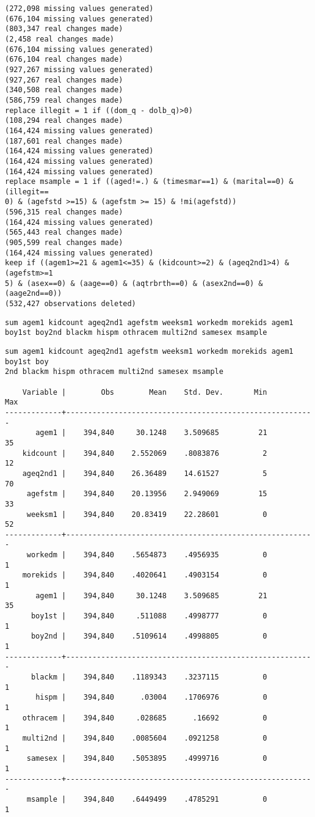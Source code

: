 \documentclass[cache=false]{article}
\begin{document}
\begin{verbatim}
(272,098 missing values generated)
(676,104 missing values generated)
(803,347 real changes made)
(2,458 real changes made)
(676,104 missing values generated)
(676,104 real changes made)
(927,267 missing values generated)
(927,267 real changes made)
(340,508 real changes made)
(586,759 real changes made)
replace illegit = 1 if ((dom_q - dolb_q)>0)
(108,294 real changes made)
(164,424 missing values generated)
(187,601 real changes made)
(164,424 missing values generated)
(164,424 missing values generated)
(164,424 missing values generated)
replace msample = 1 if ((aged!=.) & (timesmar==1) & (marital==0) & (illegit==
0) & (agefstd >=15) & (agefstm >= 15) & !mi(agefstd))
(596,315 real changes made)
(164,424 missing values generated)
(565,443 real changes made)
(905,599 real changes made)
(164,424 missing values generated)
keep if ((agem1>=21 & agem1<=35) & (kidcount>=2) & (ageq2nd1>4) & (agefstm>=1
5) & (asex==0) & (aage==0) & (aqtrbrth==0) & (asex2nd==0) & (aage2nd==0))
(532,427 observations deleted)
\end{verbatim}

\begin{verbatim}
sum agem1 kidcount ageq2nd1 agefstm weeksm1 workedm morekids agem1 boy1st boy2nd blackm hispm othracem multi2nd samesex msample
\end{verbatim}

\begin{verbatim}
sum agem1 kidcount ageq2nd1 agefstm weeksm1 workedm morekids agem1 boy1st boy
2nd blackm hispm othracem multi2nd samesex msample

    Variable |        Obs        Mean    Std. Dev.       Min        Max
-------------+---------------------------------------------------------
       agem1 |    394,840     30.1248    3.509685         21         35
    kidcount |    394,840    2.552069    .8083876          2         12
    ageq2nd1 |    394,840    26.36489    14.61527          5         70
     agefstm |    394,840    20.13956    2.949069         15         33
     weeksm1 |    394,840    20.83419    22.28601          0         52
-------------+---------------------------------------------------------
     workedm |    394,840    .5654873    .4956935          0          1
    morekids |    394,840    .4020641    .4903154          0          1
       agem1 |    394,840     30.1248    3.509685         21         35
      boy1st |    394,840     .511088    .4998777          0          1
      boy2nd |    394,840    .5109614    .4998805          0          1
-------------+---------------------------------------------------------
      blackm |    394,840    .1189343    .3237115          0          1
       hispm |    394,840      .03004    .1706976          0          1
    othracem |    394,840     .028685      .16692          0          1
    multi2nd |    394,840    .0085604    .0921258          0          1
     samesex |    394,840    .5053895    .4999716          0          1
-------------+---------------------------------------------------------
     msample |    394,840    .6449499    .4785291          0          1
\end{verbatim}
\end{document}
